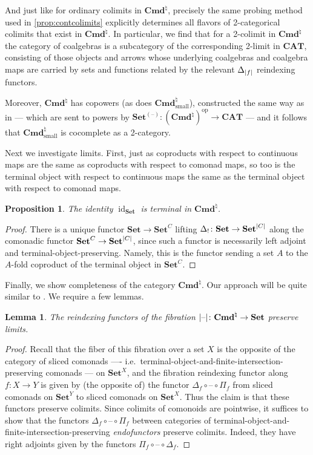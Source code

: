 \documentclass[11pt, oneside, article]{memoir}
\theoremstyle{plain}
\newtheorem{proposition}[theorem]{Proposition}
\newtheorem{lemma}[theorem]{Lemma}
\theoremstyle{definition}
\theoremstyle{remark}
\newenvironment{remark}
{\renewcommand\qedsymbol{$\lrcorner$}%
  \pushQED{\qed}\myremark}
{\popQED\endmyremark}
\DeclareMathOperator{\id}{id}
\DeclareMathOperator{\ophelper}{op}
\DeclarePairedDelimiter{\abs}{\lvert}{\rvert}
\newcommand{\dash}{{\mathord{\text{--}}}}
\newcommand{\op}{^{\ophelper}}
\newcommand{\bang}{\mathrm{!}}
\newcommand{\namedcat}[1]{\mathbf{#1}}
\newcommand{\Set}{\namedcat{Set}}
\newcommand{\CAT}{\namedcat{CAT}}
\newcommand{\Con}{\namedcat{Cmd}^\natural}
\newcommand{\ConSet}{\Con}
\newcommand{\ConO}{\Con}
\newcommand{\ConOSet}{\ConO}
\newcommand{\CoalgOn}[2]{{#2}^{#1}}
\newcommand{\CoalgSet}[1]{\CoalgOn{#1}{\Set}}
\newcommand{\pts}[1]{{\abs{#1}}}
\newcommand{\one}[1]{\pts{#1}}
\newcommand{\reindex}[1]{\Delta_{#1}}
\newcommand{\slicer}{\Delta_\bang}
\newcommand{\AccCon}{\Con_{\mathrm{small}}}
\newcommand{\AccConSet}{\AccCon}
\newcommand{\cmnd}[1]{{#1}}
\newcommand{\xA}{A}
\newcommand{\xX}{X}
\newcommand{\cC}{\cmnd{C}}
\newcommand{\CSet}{\CoalgSet{\cC}}
\newcommand{\SetpC}{\Set^\pts{\cC}}
\newcommand{\idSet}{\id_\Set}
\begin{document}
\begin{remark}
  And just like for ordinary colimits in $\ConOSet$, precisely the
  same probing method used in \cref{prop:contcolimits} explicitly
  determines all flavors of 2-categorical colimits that exist in
  $\ConSet$. In particular, we find that for a 2-colimit in $\ConSet$
  the category of coalgebras is a subcategory of the corresponding
  2-limit in $\CAT$, consisting of those objects and arrows whose
  underlying coalgebras and coalgebra maps are carried by sets and
  functions related by the relevant $\reindex{\one{f}}$ reindexing
  functors.

  Moreover, $\ConOSet$ has copowers (as does $\AccConSet$),
  constructed the same way as in \cite[Theorem 6.1]{garner:ionads} ---
  which are sent to powers by
  $\Set^{(\dash)} \colon (\ConOSet)\op \to \CAT$ --- and it follows
  that $\AccConSet$ is cocomplete as a 2-category.
\end{remark}

Next we investigate limits. First, just as coproducts with respect to
continuous maps are the same as coproducts with respect to comonad
maps, so too is the terminal object with respect to continuous maps
the same as the terminal object with respect to comonad maps.

\begin{proposition}\label{prop:conterminal}
  The identity $\idSet$ is terminal in $\ConOSet$.
\end{proposition}
\begin{proof}
  There is a unique functor $\Set \to \CSet$ lifting
  $\slicer \colon \Set \to \SetpC$ along the comonadic functor
  $\CSet \to \SetpC$, since such a functor is necessarily left adjoint
  and terminal-object-preserving. Namely, this is the functor sending
  a set $\xA$ to the $\xA$-fold coproduct of the terminal object in
  $\CSet$.
\end{proof}

Finally, we show completeness of the category $\ConSet$. Our approach
will be quite similar to \cite{garner:ionads}. We require a few
lemmas.

\begin{lemma}\label{lem:reindexlimits}
  The reindexing functors of the fibration
  $\one{\dash} \colon \ConOSet \to \Set$ preserve limits.
\end{lemma}
\begin{proof}
  Recall that the fiber of this fibration over a set $X$ is the
  opposite of the category of sliced comonads ---- i.e.\
  terminal-object-and-finite-intersection-preserving comonads --- on
  $\Set^\xX$, and the fibration reindexing functor along
  $f \colon X \to Y$ is given by (the opposite of) the functor
  $\reindex{f} \circ \dash \circ \Pi_{f}$ from sliced comonads on
  $\Set^Y$ to sliced comonads on $\Set^\xX$. Thus the claim is that
  these functors preserve colimits. Since colimits of comonoids are
  pointwise, it suffices to show that the functors
  $\reindex{f} \circ \dash \circ \Pi_{f}$ between categories of
  terminal-object-and-finite-intersection-preserving
  \emph{endofunctors} preserve colimits. Indeed, they have right
  adjoints given by the functors
  $\Pi_{f} \circ \dash \circ \reindex{f}$.
\end{proof}
\end{document}

